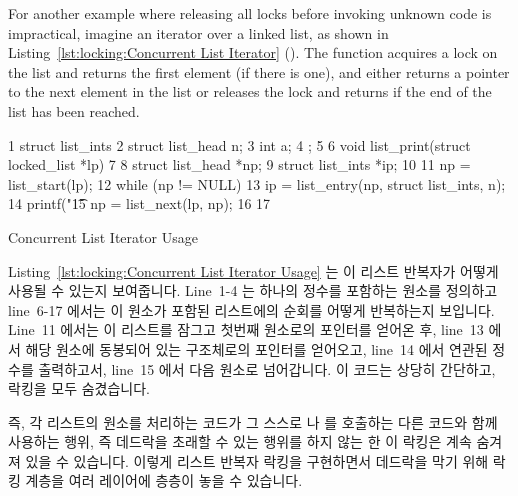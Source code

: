 For another example where releasing all locks before invoking unknown
code is impractical, imagine an iterator over a linked list, as shown in
Listing~\ref{lst:locking:Concurrent List Iterator} ().
The  function acquires a lock on the list and returns
the first element (if there is one), and
 either returns a pointer to the next element in the list
or releases the lock and returns  if the end of the list has
been reached.
\fi

\begin{listing}[tbp]
{ \scriptsize
\begin{verbbox}
  1 struct list_ints {
  2   struct list_head n;
  3   int a;
  4 };
  5 
  6 void list_print(struct locked_list *lp)
  7 {
  8   struct list_head *np;
  9   struct list_ints *ip;
 10 
 11   np = list_start(lp);
 12   while (np != NULL) {
 13     ip = list_entry(np, struct list_ints, n);
 14     printf("\t%
 15     np = list_next(lp, np);
 16   }
 17 }
\end{verbbox}
}
\centering
\theverbbox
\caption{Concurrent List Iterator Usage}
\label{lst:locking:Concurrent List Iterator Usage}
\end{listing}

Listing~\ref{lst:locking:Concurrent List Iterator Usage} 는 이 리스트 반복자가
어떻게 사용될 수 있는지 보여줍니다.
Line~1-4 는 하나의 정수를 포함하는  원소를 정의하고 line~6-17
에서는 이 원소가 포함된 리스트에의 순회를 어떻게 반복하는지 보입니다.
Line~11 에서는 이 리스트를 잠그고 첫번째 원소로의 포인터를 얻어온 후, line~13
에서 해당 원소에 동봉되어 있는  구조체로의 포인터를 얻어오고,
line~14 에서 연관된 정수를 출력하고서, line~15 에서 다음 원소로 넘어갑니다.
이 코드는 상당히 간단하고, 락킹을 모두 숨겼습니다.

즉, 각 리스트의 원소를 처리하는 코드가 그 스스로  나
 를 호출하는 다른 코드와 함께 사용하는 행위, 즉 데드락을 초래할
수 있는 행위를 하지 않는 한 이 락킹은 계속 숨겨져 있을 수 있습니다.
이렇게 리스트 반복자 락킹을 구현하면서 데드락을 막기 위해 락킹 계층을 여러
레이어에 층층이 놓을 수 있습니다.


